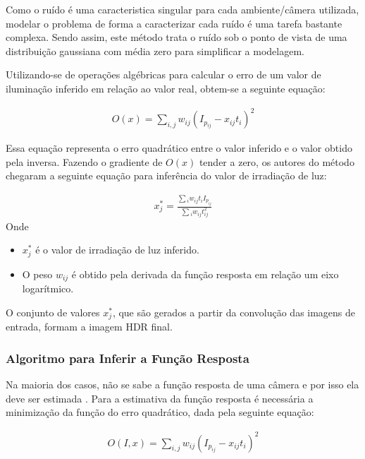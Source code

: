 Como o ruído é uma caracteristica singular para cada ambiente/câmera utilizada, modelar o problema de forma a caracterizar cada ruído é uma tarefa bastante complexa. Sendo assim, este método trata o ruído sob o ponto de vista de uma distribuição gaussiana com média zero para simplificar a modelagem.

Utilizando-se de operações algébricas para calcular o erro de um valor de iluminação inferido em relação ao valor real, obtem-se a seguinte equação:

\begin{align} \label{eqRobertsonErr}
	O(x) = \sum\limits_{i,j}{w_{ij}(I_{p_{ij}} - x_{ij}t_{i})^2}
\end{align}

Essa equação representa o erro quadrático entre o valor inferido e o valor obtido pela inversa. Fazendo o gradiente de $O(x)$ tender a zero, os autores do método chegaram a seguinte equação para inferência do valor de irradiação de luz:

\begin{align} \label{eqRobertsonGeracao}
	x^{*}_j = \frac{\sum{_i w_{ij}t_{i}I_{p_{ij}}}}{\sum{_i w_{ij}t_{ij}^{2}}}
\end{align}
Onde
\begin{itemize}
\item $x^{*}_j$ é o valor de irradiação de luz inferido.
\item O peso $w_{ij}$ é obtido pela derivada da função resposta em relação um eixo logarítmico. 
\end{itemize}

O conjunto de valores $x^{*}_j$, que são gerados a partir da convolução das imagens de entrada, formam a imagem HDR final.

\subsubsection{Algoritmo para Inferir a Função Resposta} \label{metodoRobertsonAlg}

Na maioria dos casos, não se sabe a função resposta de uma câmera e por isso ela deve ser estimada \cite{robertson}. Para a estimativa da função resposta é necessária a minimização da função do erro quadrático, dada pela seguinte equação:

\begin{align} \label{eqRobertsonErr2}
	O(I,x) = \sum\limits_{i,j}{w_{ij}(I_{p_{ij}} - x_{ij}t_{i})^2}
\end{align}

